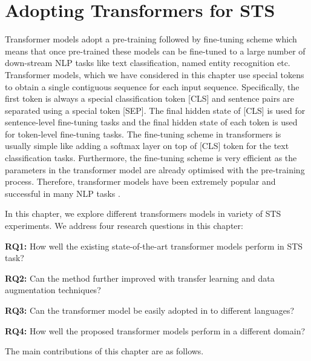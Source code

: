 \chapter{\label{cha:sts_transformers}Adopting Transformers for STS}




Transformer models adopt a pre-training followed by fine-tuning scheme which means that once pre-trained these models can be fine-tuned to a large number of down-stream NLP tasks like text classification, named entity recognition etc.  Transformer models, which we have considered in this chapter use special tokens to obtain a single contiguous sequence for each input sequence. Specifically, the first token is always a special classification token \textsc{[CLS]} and sentence pairs are separated using a special token \textsc{[SEP]}. The final hidden state of \textsc{[CLS]}  is used for sentence-level fine-tuning tasks and the final hidden state of each token is used for token-level fine-tuning tasks. The fine-tuning scheme in transformers is usually simple like adding a softmax layer on top of \textsc{[CLS]} token for the text classification tasks. Furthermore, the fine-tuning scheme is very efficient as the parameters in the transformer model are already optimised with the pre-training process. Therefore, transformer models have been extremely popular and successful in many NLP tasks \cite{devlin-etal-2019-bert}. 

In this chapter, we explore different transformers models in variety of STS experiments. 
We address four research questions in this chapter:

\textbf{RQ1:} How well the existing state-of-the-art transformer models perform in STS task? 

\textbf{RQ2:} Can the method further improved with transfer learning and data augmentation techniques?

\textbf{RQ3:} Can the transformer model be easily adopted in to different languages?

\textbf{RQ4:} How well the proposed transformer models perform in a different domain? 

The main contributions of this chapter are as follows.

